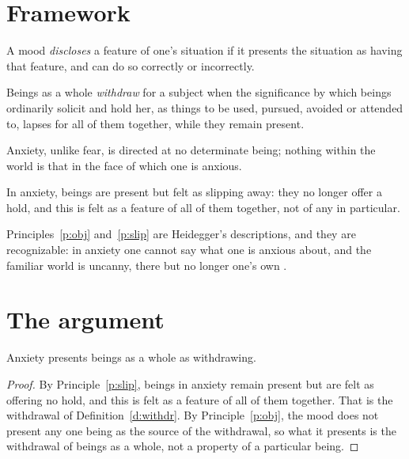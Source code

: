 \documentclass{situationist-preprint}
\begin{document}
\section{Framework}

\begin{definition}[Disclosure]\label{d:disc}
A mood \emph{discloses} a feature of one's situation if it presents the situation as having that feature, and can do so correctly or incorrectly.
\end{definition}

\begin{definition}\label{d:withdr}
Beings as a whole \emph{withdraw} for a subject when the significance by which beings ordinarily solicit and hold her, as things to be used, pursued, avoided or attended to, lapses for all of them together, while they remain present.
\end{definition}

\begin{principle}\label{p:obj}
Anxiety, unlike fear, is directed at no determinate being; nothing within the world is that in the face of which one is anxious.
\end{principle}

\begin{principle}\label{p:slip}
In anxiety, beings are present but felt as slipping away: they no longer offer a hold, and this is felt as a feature of all of them together, not of any in particular.
\end{principle}

Principles~\ref{p:obj} and~\ref{p:slip} are Heidegger's descriptions, and they are recognizable: in anxiety one cannot say what one is anxious about, and the familiar world is uncanny, there but no longer one's own \citep[\S 40]{Heidegger1927}.

\section{The argument}

\begin{lemma}\label{l:withdr}
Anxiety presents beings as a whole as withdrawing.
\end{lemma}

\begin{proof}
By Principle~\ref{p:slip}, beings in anxiety remain present but are felt as offering no hold, and this is felt as a feature of all of them together. That is the withdrawal of Definition~\ref{d:withdr}. By Principle~\ref{p:obj}, the mood does not present any one being as the source of the withdrawal, so what it presents is the withdrawal of beings as a whole, not a property of a particular being.
\end{proof}
\end{document}
